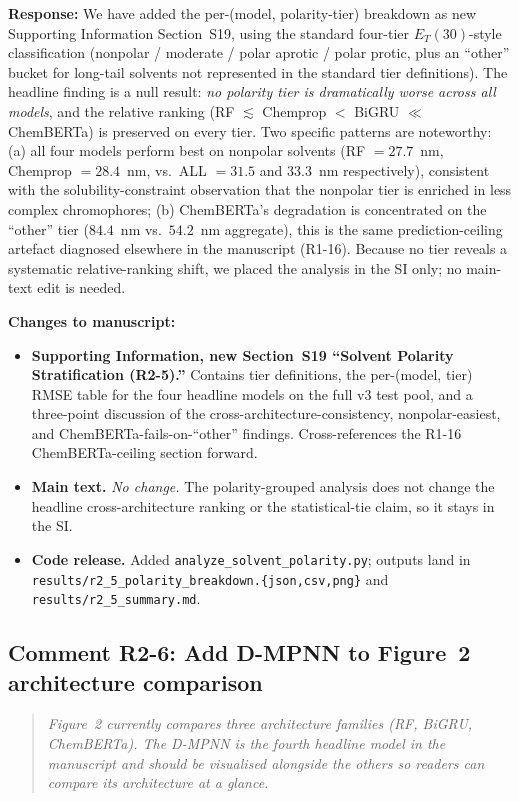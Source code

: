 \documentclass[11pt]{article}
\newenvironment{reviewer}{%
  \begin{quote}\itshape\color{black!70}}{%
  \end{quote}}
\newcommand{\response}[1]{\noindent\textbf{Response:} #1\par\medskip}
\newenvironment{changes}{%
  \noindent\textbf{Changes to manuscript:}
  \begin{itemize}[leftmargin=2em,itemsep=2pt]}{%
  \end{itemize}\medskip}
\begin{document}
\response{We have added the per-(model, polarity-tier) breakdown as new Supporting Information Section~S19, using the standard four-tier $E_T(30)$-style classification (nonpolar / moderate / polar aprotic / polar protic, plus an ``other'' bucket for long-tail solvents not represented in the standard tier definitions). The headline finding is a null result: \emph{no polarity tier is dramatically worse across all models}, and the relative ranking (RF $\lesssim$ Chemprop $<$ BiGRU $\ll$ ChemBERTa) is preserved on every tier. Two specific patterns are noteworthy: (a) all four models perform best on nonpolar solvents (RF $= 27.7$~nm, Chemprop $= 28.4$~nm, vs.\ ALL $= 31.5$ and $33.3$~nm respectively), consistent with the solubility-constraint observation that the nonpolar tier is enriched in less complex chromophores; (b) ChemBERTa's degradation is concentrated on the ``other'' tier ($84.4$~nm vs.\ $54.2$~nm aggregate), this is the same prediction-ceiling artefact diagnosed elsewhere in the manuscript (R1-16). Because no tier reveals a systematic relative-ranking shift, we placed the analysis in the SI only; no main-text edit is needed.}

\begin{changes}
  \item \textbf{Supporting Information, new Section~S19 ``Solvent Polarity Stratification (R2-5).''} Contains tier definitions, the per-(model, tier) RMSE table for the four headline models on the full v3 test pool, and a three-point discussion of the cross-architecture-consistency, nonpolar-easiest, and ChemBERTa-fails-on-``other'' findings. Cross-references the R1-16 ChemBERTa-ceiling section forward.
  \item \textbf{Main text.} \emph{No change.} The polarity-grouped analysis does not change the headline cross-architecture ranking or the statistical-tie claim, so it stays in the SI.
  \item \textbf{Code release.} Added \texttt{analyze\_solvent\_polarity.py}; outputs land in \texttt{results/r2\_5\_polarity\_breakdown.\{json,csv,png\}} and \texttt{results/r2\_5\_summary.md}.
\end{changes}

\subsection*{Comment R2-6: Add D-MPNN to Figure~2 architecture comparison}
\begin{reviewer}
Figure~2 currently compares three architecture families (RF, BiGRU, ChemBERTa). The D-MPNN is the fourth headline model in the manuscript and should be visualised alongside the others so readers can compare its architecture at a glance.
\end{reviewer}
\end{document}
